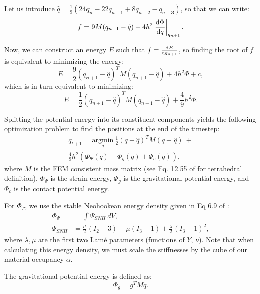 Let us introduce $\hat{q} = \frac{1}{9}(24q_n - 22q_{n-1} + 8q_{n-2} - q_{n-3})$, so that we can write:
\begin{equation*}
f = 9 M(q_{n+1} - \hat{q}) + 4h^2 \left.\dv{\Phi}{q} \right\vert_{q_{n+1}}.
\end{equation*}

Now, we can construct an energy $E$ such that $f = \dv{E}{q_{n+1}}$, so finding the root of $f$ is equivalent to minimizing the energy:
\begin{equation*}
E = \frac{9}{2} (q_{n+1} - \hat{q})^T M (q_{n+1} - \hat{q}) + 4 h^2 \Phi + c,
\end{equation*}
which is in turn equivalent to minimizing:
\begin{equation}
E = \frac{1}{2} (q_{n+1} - \hat{q})^T M (q_{n+1} - \hat{q}) + \frac{4}{9} h^2 \Phi.
\end{equation}

Splitting the potential energy into its constituent components yields the following optimization problem to find the positions at the end of the timestep:
\begin{multline}
\label{eq:sim-energy}
	q_{t+1} = \underset{q}{\mathrm{argmin}} \ \frac{1}{2} (q-\hat{q})^T M (q-\hat{q})\ + \\ \frac{4}{9}h^2 (\Phi_\Psi(q) + \Phi_g(q) + \Phi_c(q)),
\end{multline}
where $M$ is the FEM consistent mass matrix (see Eq. 12.55 of \citet{fem-book-rao} for tetrahedral definition), $\Phi_\Psi$ is the strain energy, $\Phi_g$ is the gravitational potential energy, and $\Phi_c$ is the contact potential energy.

For $ \Phi_\Psi$, we use the stable Neohookean energy density given in Eq 6.9 of \citet{dynamic-deformables}: 
\begin{equation}
\begin{split}
 \Phi_\Psi &= \int \Psi_{SNH}\ dV, \\
\Psi_{SNH} &= \frac{\mu}{2}(I_2-3) - \mu(I_3-1) + \frac{\lambda}{2}(I_3-1)^2,
\end{split}
\end{equation}
where $\lambda, \mu$ are the first two Lam\'e parameters (functions of $Y$, $\nu$). Note that when calculating this energy density, we must scale the stiffnesses by the cube of our material occupancy $\alpha$.

The gravitational potential energy is defined as: 
\begin{equation}
 \Phi_g = g^T M q.
\end{equation}

